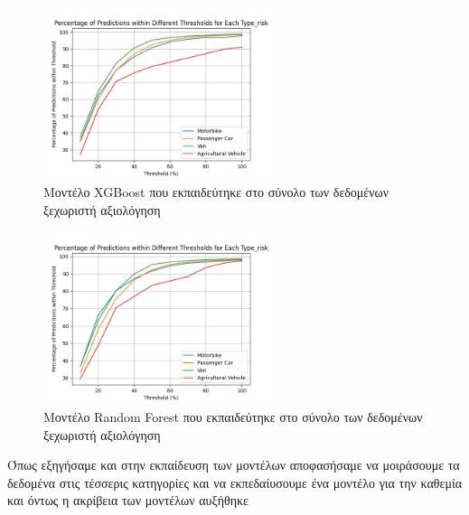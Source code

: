 \documentclass{llncs}
\begin{document}
\begin{figure}
    \begin{center}
        \includegraphics[width=0.6\textwidth]{images/combined_trained_individual_thresholds_xgb.png}
    \end{center}
    \caption{Μοντέλο XGBoost που εκπαιδεύτηκε στο σύνολο των δεδομένων ξεχωριστή αξιολόγηση}  
    \label{fig:XGBoost_result_all_individual}  
\end{figure}

\begin{figure}
    \begin{center}
        \includegraphics[width=0.6\textwidth]{images/combined_trained_individual_thresholds_random_forest.png}
    \end{center}
    \caption{Μοντέλο Random Forest που εκπαιδεύτηκε στο σύνολο των δεδομένων ξεχωριστή αξιολόγηση}  
    \label{fig:random_forest_result_all_individual}  
\end{figure}


Όπως εξηγήσαμε και στην εκπαίδευση των μοντέλων αποφασήσαμε να μοιράσουμε τα 
δεδομένα στις τέσσερις κατηγορίες και να εκπεδαίυσουμε ένα μοντέλο για την καθεμία
και όντως η ακρίβεια των μοντέλων αυξήθηκε 
\end{document}
